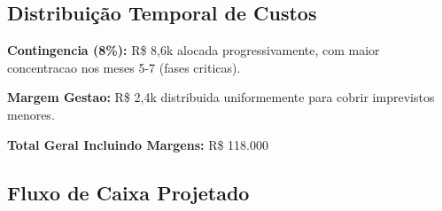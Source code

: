 \subsection{Distribuição Temporal de Custos}

\begin{table}[H]
\centering
\caption{Distribuição de custos ao longo do projeto (em milhares de reais).}%
\label{tab:distribuicao-temporal}
\footnotesize
{}
\end{table}

\textbf{Contingencia (8\%):} R\$ 8,6k alocada progressivamente, com maior concentracao nos meses 5-7 (fases criticas).

\textbf{Margem Gestao:} R\$ 2,4k distribuida uniformemente para cobrir imprevistos menores.

\textbf{Total Geral Incluindo Margens:} R\$ 118.000

\subsection{Fluxo de Caixa Projetado}

